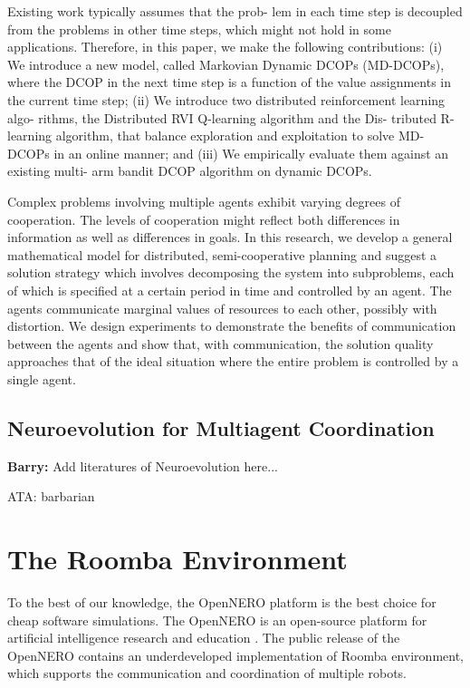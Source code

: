 \documentclass[conference]{IEEEtran}
\begin{document}
\cite{nguyen2014decentralized} Existing work typically assumes that the prob-
lem in each time step is decoupled from the problems in other time steps,
which might not hold in some applications. Therefore, in this paper, we make
the following contributions: (i) We introduce a new model, called Markovian
Dynamic DCOPs (MD-DCOPs), where the DCOP in the next time step is a function
of the value assignments in the current time step; (ii) We introduce two
distributed reinforcement learning algo- rithms, the Distributed RVI
Q-learning algorithm and the Dis- tributed R-learning algorithm, that balance
exploration and exploitation to solve MD-DCOPs in an online manner; and (iii)
We empirically evaluate them against an existing multi- arm bandit DCOP
algorithm on dynamic DCOPs.


\cite{zhang2013coordinating}

\cite{banerjee2012sample}

\cite{kraemer2012informed}

\cite{boukhtouta2011adaptive}
Complex problems involving multiple agents exhibit varying degrees of
cooperation. The levels of cooperation might reflect both differences in
information as well as differences in goals. In this research, we develop a
general mathematical model for distributed, semi-cooperative planning and
suggest a solution strategy which involves decomposing the system into
subproblems, each of which is specified at a certain period in time and
controlled by an agent. The agents communicate marginal values of resources to
each other, possibly with distortion. We design experiments to demonstrate the
benefits of communication between the agents and show that, with
communication, the solution quality approaches that of the ideal situation
where the entire problem is controlled by a single agent.

\cite{sen1994learning}

\subsection{Neuroevolution for Multiagent Coordination}
\textbf{Barry:}
Add literatures of Neuroevolution here...

ATA: barbarian


\section{The Roomba Environment} \label{section:environment}
To the best of our knowledge, the OpenNERO platform is the best choice for
cheap software simulations. 
The OpenNERO is an open-source platform for artificial intelligence
research and education \cite{karpov2008opennero}. 
The public release of the OpenNERO contains an underdeveloped implementation
of Roomba environment, which supports the communication and coordination of
multiple robots.
\end{document}
